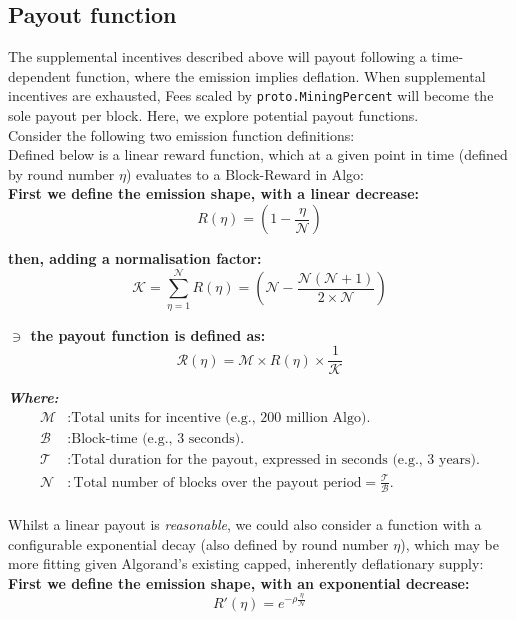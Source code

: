 \documentclass[11pt,a4paper]{article}
\begin{document}
\pagebreak

\subsection{Payout function}
The supplemental incentives described above will payout following a time-dependent function, where the emission implies 
deflation. When supplemental incentives are exhausted, Fees scaled by \texttt{proto.MiningPercent} will become the sole 
payout per block. Here, we explore potential payout functions. \\

Consider the following two emission function definitions: \\

Defined below is a linear reward function, which at a given point in time (defined by round number $\eta$) evaluates to 
a \gls{Block-Reward} in Algo:\\

\textbf{First we define the emission shape, with a linear decrease:}
\[
R(\eta) = (1- \frac{\eta}{\mathcal{N}})
\]

\textbf{then, adding a normalisation factor:}
\[
\mathcal{K} = \sum_{\eta=1}^\mathcal{N}R(\eta)=(\mathcal{N} -  \frac{\mathcal{N}(\mathcal{N}+1)}{2\times \mathcal{N}})  
\]

\textbf{$\ni$ the payout function is defined as:}
\[
\mathcal{R}(\eta) = \mathcal{M} \times R(\eta) \times \frac{1}{\mathcal{K}}
\]

\textbf{\emph{Where:}}
\begin{align*}
    \mathcal{M} & : \text{Total units for incentive (e.g., 200 million Algo).} \\
    \mathcal{B} & : \text{Block-time (e.g., 3 seconds).} \\
    \mathcal{T} & : \text{Total duration for the payout, expressed in seconds (e.g., 3 years).} \\
    \mathcal{N} & : \text{Total number of blocks over the payout period} = \frac{\mathcal{T}}{\mathcal{B}}.\\
\end{align*}

Whilst a linear payout is \textit{reasonable}, we could also consider a function with a configurable exponential decay 
(also defined by round number $\eta$), which may be more fitting given Algorand's existing capped, inherently 
deflationary supply: \\ 

\textbf{First we define the emission shape, with an exponential decrease:}
\[
R'(\eta)= e^{-\rho\frac{\eta}{\mathcal{N}}}
\]
\end{document}
